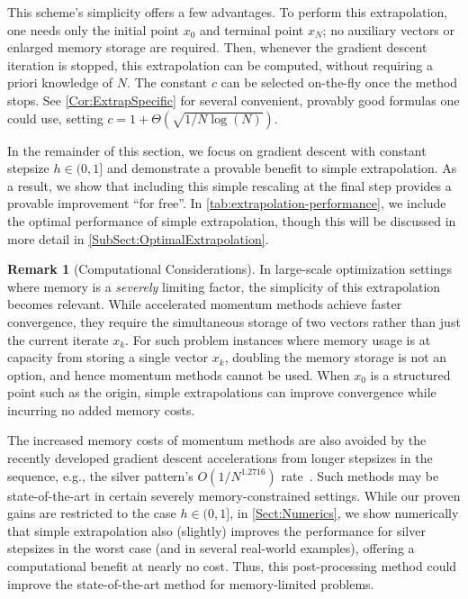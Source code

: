 \documentclass[11pt]{article}
\numberwithin{equation}{section}
\theoremstyle{definition}
\newtheorem{remark}{Remark}
\theoremstyle{definition}
\theoremstyle{definition}
\newcommand{\1}{\mathbf{1}}
\begin{document}
This scheme's simplicity offers a few advantages. To perform this extrapolation, one needs only the initial point $x_0$ and terminal point $x_N$; no auxiliary vectors or enlarged memory storage are required. Then, whenever the gradient descent iteration is stopped, this extrapolation can be computed, without requiring a priori knowledge of $N$. The constant $c$ can be selected on-the-fly once the method stops. See \cref{Cor:ExtrapSpecific} for several convenient, provably good formulas one could use, setting $c = 1 + \Theta(\sqrt{1/N\log(N)})$.

In the remainder of this section, we focus on gradient descent with constant stepsize $h \in (0,1]$ and demonstrate a provable benefit to simple extrapolation. As a result, we show that including this simple rescaling at the final step provides a provable improvement ``for free''. In \cref{tab:extrapolation-performance}, we include the optimal performance of simple extrapolation, though this will be discussed in more detail in \cref{SubSect:OptimalExtrapolation}.

\begin{remark}[Computational Considerations]\label{Remark:memoryCost}
    In large-scale optimization settings where memory is a \textit{severely} limiting factor, the simplicity of this extrapolation becomes relevant. While accelerated momentum methods achieve faster convergence, they require the simultaneous storage of two vectors rather than just the current iterate $x_k$. For such problem instances where memory usage is at capacity from storing a single vector $x_k$, doubling the memory storage is not an option, and hence momentum methods cannot be used. When $x_0$ is a structured point such as the origin, simple extrapolations can improve convergence while incurring no added memory costs.
    
    The increased memory costs of momentum methods are also avoided by the recently developed gradient descent accelerations from longer stepsizes in the sequence, e.g., the silver pattern's $O(1/N^{1.2716})$ rate~\cite{Silver_Accel}. Such methods may be state-of-the-art in certain severely memory-constrained settings. While our proven gains are restricted to the case $h \in (0,1]$, in \cref{Sect:Numerics}, we show numerically that simple extrapolation also (slightly) improves the performance for silver stepsizes in the worst case (and in several real-world examples), offering a computational benefit at nearly no cost. Thus, this post-processing method could improve the state-of-the-art method for memory-limited problems.
\end{remark}
\end{document}
